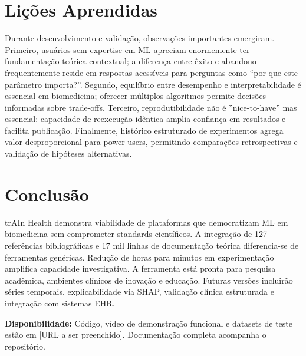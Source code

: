 \documentclass[12pt]{article}
\begin{document}
\section{Lições Aprendidas}

Durante desenvolvimento e validação, observações importantes emergiram. Primeiro, usuários sem expertise em ML apreciam enormemente ter fundamentação teórica contextual; a diferença entre êxito e abandono frequentemente reside em respostas acessíveis para perguntas como ``por que este parâmetro importa?''. Segundo, equilíbrio entre desempenho e interpretabilidade é essencial em biomedicina; oferecer múltiplos algoritmos permite decisões informadas sobre trade-offs. Terceiro, reprodutibilidade não é ''nice-to-have'' mas essencial: capacidade de reexecução idêntica amplia confiança em resultados e facilita publicação. Finalmente, histórico estruturado de experimentos agrega valor desproporcional para power users, permitindo comparações retrospectivas e validação de hipóteses alternativas.

\section{Conclusão}

trAIn Health demonstra viabilidade de plataformas que democratizam ML em biomedicina sem comprometer standards científicos. A integração de 127 referências bibliográficas e 17 mil linhas de documentação teórica diferencia-se de ferramentas genéricas. Redução de horas para minutos em experimentação amplifica capacidade investigativa. A ferramenta está pronta para pesquisa acadêmica, ambientes clínicos de inovação e educação. Futuras versões incluirão séries temporais, explicabilidade via SHAP, validação clínica estruturada e integração com sistemas EHR.

\vspace{0.25cm}

\noindent \textbf{Disponibilidade:} Código, vídeo de demonstração funcional e datasets de teste estão em [URL a ser preenchido]. Documentação completa acompanha o repositório.
\end{document}
